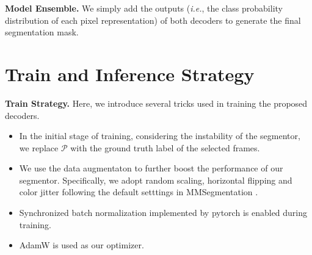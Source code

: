 \documentclass[10pt,twocolumn,letterpaper]{article}
\begin{document}
\noindent \textbf{Model Ensemble.} We simply add the outputs (\emph{i.e.}, the class probability distribution of each pixel representation) of both decoders to generate the final segmentation mask.

\begin{table}[t]
\centering
\caption{
   Ablation study of model ensemble on the validation set of VSPW. All the models are trained on the train set and tested under single-scale.
}\label{table1}
\end{table}



\section{Train and Inference Strategy} \label{strategy}
\noindent \textbf{Train Strategy.} 
Here, we introduce several tricks used in training the proposed decoders.
\begin{itemize}
   \item In the initial stage of training, considering the instability of the segmentor,
   we replace $\mathcal{P}$ with the ground truth label of the selected frames.
   
   \item We use the data augmentaton to further boost the performance of our segmentor.
   Specifically, we adopt random scaling, horizontal flipping and color jitter following the default setttings in MMSegmentation \cite{mmseg2020}.

   \item Synchronized batch normalization implemented by pytorch is enabled during training. 
   
   \item  AdamW is used as our optimizer.
   
\end{itemize}
\end{document}
